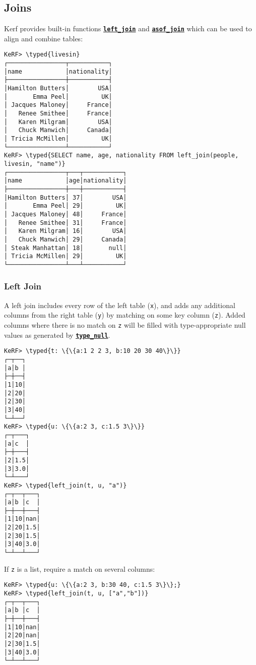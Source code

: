 \documentclass{article}
\newcommand{\typed}[1]{\textcolor{TealBlue}{#1}}
\newcommand{\primu}[2]{\hyperref[prim:#2]{\textbf{\texttt{#1}}}}
\begin{document}
\subsection{Joins}\label{sec:joins}
Kerf provides built-in functions \primu{left\_join}{leftJoin} and \primu{asof\_join}{asofJoin} which can be used to align and combine tables:
\begin{Verbatim}
KeRF> \typed{livesin}
┌────────────────┬───────────┐
│name            │nationality│
├────────────────┼───────────┤
│Hamilton Butters│        USA│
│       Emma Peel│         UK│
│ Jacques Maloney│     France│
│   Renee Smithee│     France│
│   Karen Milgram│        USA│
│   Chuck Manwich│     Canada│
│ Tricia McMillen│         UK│
└────────────────┴───────────┘
KeRF> \typed{SELECT name, age, nationality FROM left_join(people, livesin, "name")}
┌────────────────┬───┬───────────┐
│name            │age│nationality│
├────────────────┼───┼───────────┤
│Hamilton Butters│ 37│        USA│
│       Emma Peel│ 29│         UK│
│ Jacques Maloney│ 48│     France│
│   Renee Smithee│ 31│     France│
│   Karen Milgram│ 16│        USA│
│   Chuck Manwich│ 29│     Canada│
│ Steak Manhattan│ 18│       null│
│ Tricia McMillen│ 29│         UK│
└────────────────┴───┴───────────┘
\end{Verbatim}

\pagebreak
\subsubsection{Left Join}
A left join includes every row of the left table (\texttt{x}), and adds any additional columns from the right table (\texttt{y}) by matching on some key column (\texttt{z}). Added columns where there is no match on \texttt{z} will be filled with type-appropriate null values as generated by \primu{type\_null}{typeNull}.

\begin{Verbatim}
KeRF> \typed{t: \{\{a:1 2 2 3, b:10 20 30 40\}\}}
┌─┬──┐
│a│b │
├─┼──┤
│1│10│
│2│20│
│2│30│
│3│40│
└─┴──┘
KeRF> \typed{u: \{\{a:2 3, c:1.5 3\}\}}
┌─┬───┐
│a│c  │
├─┼───┤
│2│1.5│
│3│3.0│
└─┴───┘
KeRF> \typed{left_join(t, u, "a")}
┌─┬──┬───┐
│a│b │c  │
├─┼──┼───┤
│1│10│nan│
│2│20│1.5│
│2│30│1.5│
│3│40│3.0│
└─┴──┴───┘
\end{Verbatim}

If \texttt{z} is a list, require a match on several columns:
\begin{Verbatim}
KeRF> \typed{u: \{\{a:2 3, b:30 40, c:1.5 3\}\};}
KeRF> \typed{left_join(t, u, ["a","b"])}
┌─┬──┬───┐
│a│b │c  │
├─┼──┼───┤
│1│10│nan│
│2│20│nan│
│2│30│1.5│
│3│40│3.0│
└─┴──┴───┘
\end{Verbatim}
\end{document}
